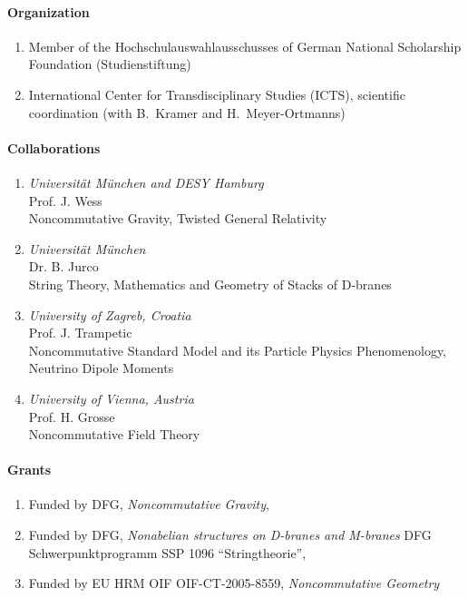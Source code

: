 \paragraph{Organization}

\begin{enumerate}
\item  Member of the Hochschulauswahlausschusses of German National
Scholarship Foundation (Studienstiftung)
\item International Center for Transdisciplinary Studies (ICTS),
scientific coordination (with B.\ Kramer and H.\ Meyer-Ortmanns)
\end{enumerate}

\paragraph{Collaborations}
\begin{enumerate}
\item {\sl Universit\"{a}t M\"{u}nchen and DESY Hamburg}\\
Prof. J. Wess\\
Noncommutative Gravity, Twisted General Relativity
\item {\sl Universit\"{a}t M\"{u}nchen}\\
Dr. B. Jurco\\
String Theory, Mathematics and Geometry of Stacks of D-branes
\item {\sl University of Zagreb, Croatia} \\
Prof. J. Trampetic \\
Noncommutative Standard Model and its Particle Physics
Phenomenology, Neutrino Dipole Moments
\item {\sl University of Vienna, Austria} \\
Prof. H. Grosse \\
Noncommutative Field Theory
\end{enumerate}


\paragraph{Grants}
\begin{enumerate}
\item Funded by DFG, \emph{Noncommutative Gravity}, \item Funded
by DFG, \emph{Nonabelian structures on D-branes and M-branes} DFG
Schwerpunktprogramm SSP 1096 ``Stringtheorie'',   \item Funded by
EU HRM OIF OIF-CT-2005-8559, \emph{Noncommutative Geometry} 
\end{enumerate}


\nocite{Schupp:2006ry,Solodukhin:2005ns,Solodukhin:2005ah,Bachmaier:2005jw}
